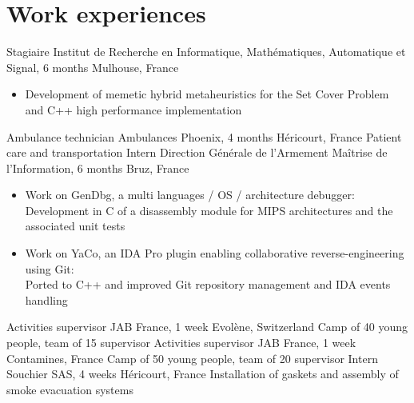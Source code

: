 \documentclass[letterpaper,10pt,sans]{moderncv}
\begin{document}
	\section{Work experiences}
			{Stagiaire}
			{Institut de Recherche en Informatique, Mathématiques, Automatique et Signal, 6 months\hspace{-25pt}}
			{Mulhouse, France}
			{}
			{}
			\vspace{-5pt}
			\begin{itemize}
				\item Development of memetic hybrid metaheuristics for the Set Cover Problem\\
					and C++ high performance implementation
			\end{itemize}
			\vspace{5pt}
			{Ambulance technician}
			{Ambulances Phoenix, 4 months}
			{Héricourt, France}
			{Patient care and transportation}
			{}
			{Intern}
			{Direction Générale de l'Armement Maîtrise de l'Information, 6 months}
			{Bruz, France}
			{}
			{}
			\vspace{-5pt}
			\begin{itemize}
				\item Work on GenDbg, a multi languages / OS / architecture debugger:\\
					\phantom{=}Development in C of a disassembly module for MIPS architectures and the associated unit tests
				\item Work on YaCo, an IDA Pro plugin enabling collaborative reverse-engineering using Git:\\
					\phantom{=}Ported to C++ and improved Git repository management and IDA events handling
			\end{itemize}
			\vspace{5pt}
			{Activities supervisor}
			{JAB France, 1 week}
			{Evolène, Switzerland}
			{Camp of 40 young people, team of 15 supervisor}
			{}
			{Activities supervisor}
			{JAB France, 1 week}
			{Contamines, France}
			{Camp of 50 young people, team of 20 supervisor}
			{}
			{Intern}
			{Souchier SAS, 4 weeks}
			{Héricourt, France}
			{Installation of gaskets and assembly of smoke evacuation systems}
			{}
\end{document}
